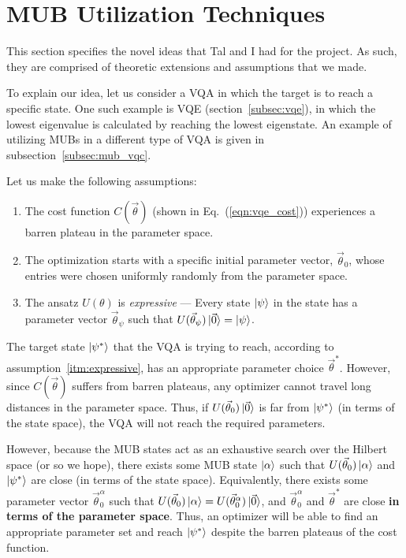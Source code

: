 \documentclass[a4paper,12pt]{article}
\newcommand{\thetas}{\vec{\theta}}
\begin{document}
\section{MUB Utilization Techniques} \label{sec:mub_use}
This section specifies the novel ideas that Tal and I had for the project. As such, they are comprised of theoretic extensions and assumptions that we made.

To explain our idea, let us consider a VQA in which the target is to reach a specific state.
One such example is VQE (section~\ref{subsec:vqe}), in which the lowest eigenvalue is calculated by reaching the lowest eigenstate.
An example of utilizing MUBs in a different type of VQA is given in subsection~\ref{subsec:mub_vqc}.

Let us make the following assumptions:
\begin{enumerate}
    \item The cost function $C(\thetas)$ (shown in Eq.~(\ref{eqn:vqe_cost})) experiences a barren plateau in the parameter space. 
    \item The optimization starts with a specific initial parameter vector, $\thetas_0$, whose entries were chosen uniformly randomly from the parameter space.
    \item The ansatz $U(\theta)$ is \emph{expressive} --- Every state $\ket{\psi}$ in the state has a parameter vector $\thetas_\psi$ such that $U(\thetas_\psi)\ket{\vec{0}} = \ket{\psi}$.
    \label{itm:expressive}
\end{enumerate}

The target state $\ket{\psi^*}$ that the VQA is trying to reach, according to assumption~\ref{itm:expressive}, has an appropriate parameter choice $\thetas^*$.
However, since $C(\thetas)$ suffers from barren plateaus, any optimizer cannot travel long distances in the parameter space.
Thus, if $U(\thetas_0)\ket{\vec{0}}$ is far from $\ket{\psi^*}$ (in terms of the state space), the VQA will not reach the required parameters.

However, because the MUB states act as an exhaustive search over the Hilbert space (or so we hope), there exists some MUB state $\ket{\alpha}$ such that $U(\thetas_0)\ket{\alpha}$ and $\ket{\psi^*}$ are close (in terms of the state space).
Equivalently, there exists some parameter vector $\thetas_0^\alpha$ such that $U(\thetas_0) \ket{\alpha} = U(\thetas_0^\alpha) \ket{\vec{0}}$, and $\thetas_0^\alpha$ and $\thetas^*$ are close \textbf{in terms of the parameter space}. Thus, an optimizer will be able to find an appropriate parameter set and reach $\ket{\psi^*}$ despite the barren plateaus of the cost function.
\end{document}
